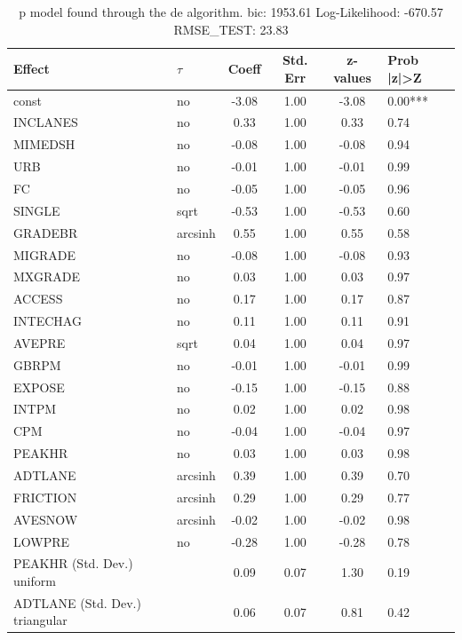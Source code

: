 \begin{table}
	\caption{p model found through the de algorithm. bic: 1953.61 Log-Likelihood: -670.57 RMSE_TEST: 23.83}
	\begin{center}
		\begin{tabular}{|l|l|c|c|c|l|}
			\hline
			Effect & $\tau$ & Coeff & Std. Err & z-values & Prob |z|>Z \\
			\hline
			const & no & -3.08 & 1.00 & -3.08 & 0.00*** \\
			\hline
			INCLANES & no & 0.33 & 1.00 & 0.33 & 0.74 \\
			\hline
			MIMEDSH & no & -0.08 & 1.00 & -0.08 & 0.94 \\
			\hline
			URB & no & -0.01 & 1.00 & -0.01 & 0.99 \\
			\hline
			FC & no & -0.05 & 1.00 & -0.05 & 0.96 \\
			\hline
			SINGLE & sqrt & -0.53 & 1.00 & -0.53 & 0.60 \\
			\hline
			GRADEBR & arcsinh & 0.55 & 1.00 & 0.55 & 0.58 \\
			\hline
			MIGRADE & no & -0.08 & 1.00 & -0.08 & 0.93 \\
			\hline
			MXGRADE & no & 0.03 & 1.00 & 0.03 & 0.97 \\
			\hline
			ACCESS & no & 0.17 & 1.00 & 0.17 & 0.87 \\
			\hline
			INTECHAG & no & 0.11 & 1.00 & 0.11 & 0.91 \\
			\hline
			AVEPRE & sqrt & 0.04 & 1.00 & 0.04 & 0.97 \\
			\hline
			GBRPM & no & -0.01 & 1.00 & -0.01 & 0.99 \\
			\hline
			EXPOSE & no & -0.15 & 1.00 & -0.15 & 0.88 \\
			\hline
			INTPM & no & 0.02 & 1.00 & 0.02 & 0.98 \\
			\hline
			CPM & no & -0.04 & 1.00 & -0.04 & 0.97 \\
			\hline
			PEAKHR & no & 0.03 & 1.00 & 0.03 & 0.98 \\
			\hline
			ADTLANE & arcsinh & 0.39 & 1.00 & 0.39 & 0.70 \\
			\hline
			FRICTION & arcsinh & 0.29 & 1.00 & 0.29 & 0.77 \\
			\hline
			AVESNOW & arcsinh & -0.02 & 1.00 & -0.02 & 0.98 \\
			\hline
			LOWPRE & no & -0.28 & 1.00 & -0.28 & 0.78 \\
			\hline
			PEAKHR (Std. Dev.) uniform &  & 0.09 & 0.07 & 1.30 & 0.19 \\
			\hline
			ADTLANE (Std. Dev.) triangular &  & 0.06 & 0.07 & 0.81 & 0.42 \\

\end{tabular}
\end{center}
\end{table}
